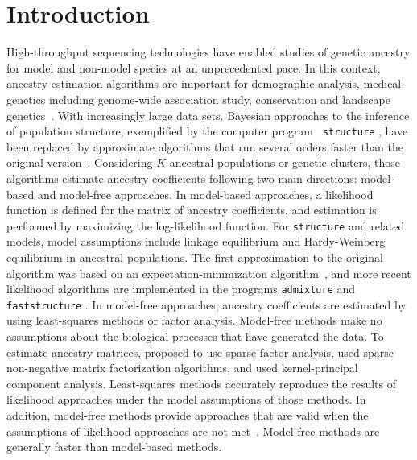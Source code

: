 \section{Introduction}

High-throughput sequencing technologies have enabled studies of genetic ancestry
for model and non-model species at an unprecedented pace. In this context,
ancestry estimation algorithms are important for demographic analysis, medical
genetics including genome-wide association study, conservation and landscape
genetics~\citep{Pritchard2000, Tang2005, Schraiber2015, Segelbacher2010,
  Francois2015}. With increasingly large data sets, Bayesian approaches to the
inference of population structure, exemplified by the computer program {\tt
  structure} \citep{Pritchard2000}, have been replaced by approximate algorithms
that run several orders faster than the original version~\citep{Tang2005,
  Alexander2011, Frichot2014, Raj2014}. Considering $K$ ancestral populations or
genetic clusters, those algorithms estimate ancestry coefficients following two
main directions: model-based and model-free approaches. In model-based
approaches, a likelihood function is defined for the matrix of ancestry
coefficients, and estimation is performed by maximizing the log-likelihood
function. For {\tt structure} and related models, model assumptions include
linkage equilibrium and Hardy-Weinberg equilibrium in ancestral populations. The
first approximation to the original algorithm was based on an
expectation-minimization algorithm~\citep{Tang2005}, and more recent likelihood
algorithms are implemented in the programs {\tt admixture} and {\tt
  faststructure} \citep{Alexander2011, Raj2014}. In model-free approaches,
ancestry coefficients are estimated by using least-squares methods or factor
analysis. Model-free methods make no assumptions about the biological processes
that have generated the data. To estimate ancestry matrices,
\cite{Engelhardt2010} proposed to use sparse factor analysis, \cite{Frichot2014}
used sparse non-negative matrix factorization algorithms, and \cite{Popescu2014}
used kernel-principal component analysis. Least-squares methods accurately
reproduce the results of likelihood approaches under the model assumptions of
those methods. In addition, model-free methods provide approaches that are valid
when the assumptions of likelihood approaches are not met~\citep{Frichot2014}.
Model-free methods are generally faster than model-based methods.
   
